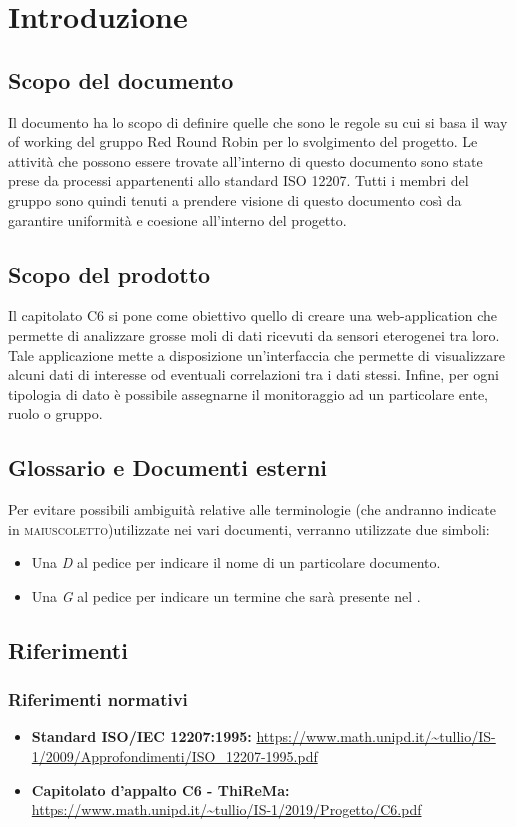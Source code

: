 \section{Introduzione}
	\subsection{Scopo del documento}
		Il documento ha lo scopo di definire quelle che sono le regole su cui si basa il way of working del gruppo Red Round Robin per lo svolgimento del progetto. Le attività che possono essere trovate all'interno di questo documento sono state prese da processi appartenenti allo standard ISO 12207. Tutti i membri del gruppo sono quindi tenuti a prendere visione di questo documento così da garantire uniformità e coesione all'interno del progetto.   
	\subsection{Scopo del prodotto}
		Il capitolato C6 si pone come obiettivo quello di creare una web-application che permette di analizzare grosse moli di dati ricevuti da sensori eterogenei tra loro. Tale applicazione mette a disposizione un'interfaccia che permette di visualizzare alcuni dati di interesse od eventuali correlazioni tra i dati stessi. Infine, per ogni tipologia di dato è possibile assegnarne il monitoraggio ad un particolare ente, ruolo o gruppo. 
	\subsection{Glossario e Documenti esterni}
		Per evitare possibili ambiguità relative alle terminologie (che andranno indicate in \textsc{maiuscoletto})utilizzate nei vari documenti, verranno utilizzate due simboli:
		\begin{itemize}
			\item Una \textit{D} al pedice per indicare il nome di un particolare documento.
			\item Una \textit{G} al pedice per indicare un termine che sarà 
			presente nel .
		\end{itemize}
	\subsection{Riferimenti}

		\subsubsection{Riferimenti normativi}
			\begin{itemize}
				\item \textbf{Standard ISO/IEC 12207:1995: } 
				\url{https://www.math.unipd.it/~tullio/IS-1/2009/Approfondimenti/ISO_12207-1995.pdf}
				\item \textbf{Capitolato d'appalto C6 - ThiReMa: } 
				\url{https://www.math.unipd.it/~tullio/IS-1/2019/Progetto/C6.pdf}
			\end{itemize}	
